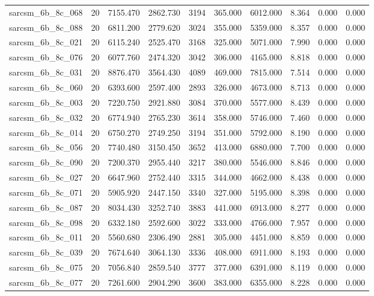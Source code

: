 \begin{tabular}{lrrrrrrrrr}
sarcsm\_6b\_8c\_068 & 20 & 7155.470 & 2862.730 & 3194 & 365.000 & 6012.000 & 8.364 & 0.000 & 0.000 \\
sarcsm\_6b\_8c\_088 & 20 & 6811.200 & 2779.620 & 3024 & 355.000 & 5359.000 & 8.357 & 0.000 & 0.000 \\
sarcsm\_6b\_8c\_021 & 20 & 6115.240 & 2525.470 & 3168 & 325.000 & 5071.000 & 7.990 & 0.000 & 0.000 \\
sarcsm\_6b\_8c\_076 & 20 & 6077.760 & 2474.320 & 3042 & 306.000 & 4165.000 & 8.818 & 0.000 & 0.000 \\
sarcsm\_6b\_8c\_031 & 20 & 8876.470 & 3564.430 & 4089 & 469.000 & 7815.000 & 7.514 & 0.000 & 0.000 \\
sarcsm\_6b\_8c\_060 & 20 & 6393.600 & 2597.400 & 2893 & 326.000 & 4673.000 & 8.713 & 0.000 & 0.000 \\
sarcsm\_6b\_8c\_003 & 20 & 7220.750 & 2921.880 & 3084 & 370.000 & 5577.000 & 8.439 & 0.000 & 0.000 \\
sarcsm\_6b\_8c\_032 & 20 & 6774.940 & 2765.230 & 3614 & 358.000 & 5746.000 & 7.460 & 0.000 & 0.000 \\
sarcsm\_6b\_8c\_014 & 20 & 6750.270 & 2749.250 & 3194 & 351.000 & 5792.000 & 8.190 & 0.000 & 0.000 \\
sarcsm\_6b\_8c\_056 & 20 & 7740.480 & 3150.450 & 3652 & 413.000 & 6880.000 & 7.700 & 0.000 & 0.000 \\
sarcsm\_6b\_8c\_090 & 20 & 7200.370 & 2955.440 & 3217 & 380.000 & 5546.000 & 8.846 & 0.000 & 0.000 \\
sarcsm\_6b\_8c\_027 & 20 & 6647.960 & 2752.440 & 3315 & 344.000 & 4662.000 & 8.438 & 0.000 & 0.000 \\
sarcsm\_6b\_8c\_071 & 20 & 5905.920 & 2447.150 & 3340 & 327.000 & 5195.000 & 8.398 & 0.000 & 0.000 \\
sarcsm\_6b\_8c\_087 & 20 & 8034.430 & 3252.740 & 3883 & 441.000 & 6913.000 & 8.277 & 0.000 & 0.000 \\
sarcsm\_6b\_8c\_098 & 20 & 6332.180 & 2592.600 & 3022 & 333.000 & 4766.000 & 7.957 & 0.000 & 0.000 \\
sarcsm\_6b\_8c\_011 & 20 & 5560.680 & 2306.490 & 2881 & 305.000 & 4451.000 & 8.859 & 0.000 & 0.000 \\
sarcsm\_6b\_8c\_039 & 20 & 7674.640 & 3064.130 & 3336 & 408.000 & 6911.000 & 8.193 & 0.000 & 0.000 \\
sarcsm\_6b\_8c\_075 & 20 & 7056.840 & 2859.540 & 3777 & 377.000 & 6391.000 & 8.119 & 0.000 & 0.000 \\
sarcsm\_6b\_8c\_077 & 20 & 7261.600 & 2904.290 & 3600 & 383.000 & 6355.000 & 8.228 & 0.000 & 0.000 \\

\end{tabular}
